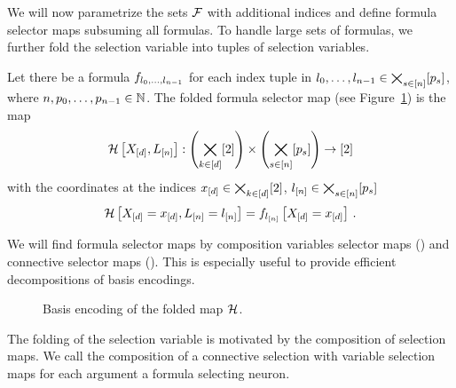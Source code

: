 
We will now parametrize the sets $\mathcal{F}$ with additional indices and define formula selector maps subsuming all formulas.
To handle large sets of formulas, we further fold the selection variable into tuples of selection variables.

\begin{definition}\label{def:formulaSelector}
	Let there be a formula $f_{l_{0},\ldots,l_{n-1}}$ for each index tuple in $l_{0},\ldots,l_{n-1}\in\bigtimes_{s\in[n]}[p_{s}]$, where $n,p_{0},\ldots,p_{n-1}\in\mathbb{N}$.
	The folded formula selector map (see Figure~\ref{fig:foldedSelector}) is the map 
		\[ \mathcal{H}\left[X_{[d]},L_{[n]}\right] : \left(\bigtimes_{k\in[d]}[2]\right) \times \left(\bigtimes_{s\in[n]}[p_{s}]\right) \rightarrow [2] \]
	with the coordinates at the indices $x_{[d]}\in\bigtimes_{k\in[d]}[2]$, $l_{[n]}\in\bigtimes_{s\in[n]}[p_{s}]$
		\[  \mathcal{H}\left[X_{[d]}=x_{[d]},L_{[n]}=l_{[n]}\right] 
		= f_{l_{[n]}}\left[X_{[d]}=x_{[d]}\right] \, . \]
\end{definition}

We will find formula selector maps by composition variables selector maps () and connective selector maps ().
This is especially useful to provide efficient decompositions of basis encodings.

\begin{figure}[h]
\begin{center}
	
\end{center}
\caption{Basis encoding of the folded map $\mathcal{H}$.}
\label{fig:foldedSelector}
\end{figure}






The folding of the selection variable is motivated by the composition of selection maps.
We call the composition of a connective selection with variable selection maps for each argument a formula selecting neuron.


